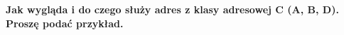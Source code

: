 \documentclass[../sk-egzamin.tex]{subfiles}
\begin{document}
\begin{tcolorbox}
\bf
Jak wygląda i do czego służy adres z klasy adresowej C (A, B, D).\\
Proszę podać przykład.
\end{tcolorbox}

\pagebreak
\end{document}

